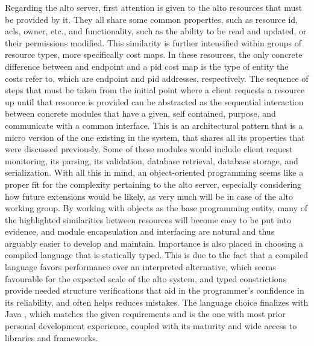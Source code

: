     Regarding the \gls{alto} server, first attention is given to the \gls{alto} resources that must be provided by it.
    They all share some common properties, such as resource id, \glspl{acl}, owner, etc., and functionality, such as the ability to be read and updated, or their permissions modified.
    This similarity is further intensified within groups of resource types, more specifically cost maps. 
    In these resources, the only concrete difference between and endpoint and a \gls{pid} cost map is the type of entity the costs refer to, which are endpoint and \gls{pid} addresses, respectively.
    The sequence of steps that must be taken from the initial point where a client requests a resource up until that resource is provided can be abstracted as the sequential interaction between concrete modules that have a given, self contained, purpose, and communicate with a common interface.
    This is an architectural pattern that is a micro version of the one existing in the system, that shares all its properties that were discussed previously.
    Some of these modules would include client request monitoring, its parsing, its validation, database retrieval, database storage, and serialization.
    With all this in mind, an object-oriented programming seems like a proper fit for the complexity pertaining to the \gls{alto} server, especially considering how future extensions would be likely, as very much will be in case of the \gls{alto} working group.
    By working with objects as the base programming entity, many of the highlighted similarities between resources will become easy to be put into evidence, and module encapsulation and interfacing are natural and thus arguably easier to develop and maintain.
    Importance is also placed in choosing a compiled language that is statically typed.
    This is due to the fact that a compiled language favors performance over an interpreted alternative, which seems favourable for the expected scale of the \gls{alto} system, and typed constrictions provide needed structure verifications that aid in the programmer's confidence in its reliability, and often helps reduces mistakes.
    The language choice finalizes with Java \cite{java}, which matches the given requirements and is the one with most prior personal development experience, coupled with its maturity and wide access to libraries and frameworks.

